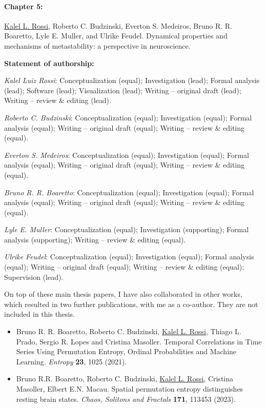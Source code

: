 \paragraph{Chapter 5:}
\underline{Kalel L. Rossi}, Roberto C. Budzinski, Everton S. Medeiros, Bruno R. R. Boaretto, Lyle E. Muller, and Ulrike Feudel. Dynamical properties and mechanisms of metastability: a perspective in neuroscience. 

{\vspace{0.3cm}\footnotesize \textbf{Statement of authorship:} %

\textit{Kalel Luiz Rossi}: Conceptualization (equal); Investigation (lead); Formal analysis (lead); Software (lead); Visualization (lead); Writing – original draft (lead); Writing – review \& editing (lead). 

\textit{Roberto C. Budzinski}: Conceptualization (equal); Investigation (equal); Formal analysis (equal); Writing – original draft (equal); Writing – review \& editing (equal).

\textit{Everton S. Medeiros}: Conceptualization (equal); Investigation (equal); Formal analysis (equal); Writing – original draft (equal); Writing – review \& editing (equal).

\textit{Bruno R. R. Boaretto}: Conceptualization (equal); Investigation (equal); Formal analysis (equal); Writing – original draft (equal); Writing – review \& editing (equal).

\textit{Lyle E. Muller}: Conceptualization (equal); Investigation (supporting); Formal analysis (supporting);  Writing – review \& editing (equal).

\textit{Ulrike Feudel}: Conceptualization (equal); Investigation (equal); Formal analysis (equal); Writing – original draft (equal); Writing – review \& editing (equal); Supervision (lead).
}

\vspace{1cm}


On top of these main thesis papers, I have also collaborated in other works, which resulted in two further publications, with me as a co-author. They are not included in this thesis.
\begin{itemize}
    \item Bruno R. R. Boaretto, Roberto C. Budzinski, \underline{Kalel L. Rossi}, Thiago L. Prado, Sergio R. Lopes and Cristina Masoller. Temporal Correlations in Time Series Using Permutation Entropy, Ordinal Probabilities and Machine Learning. \textit{Entropy} \textbf{23}, 1025 (2021).
    \item Bruno R.R. Boaretto, Roberto C. Budzinski, \underline{Kalel L. Rossi}, Cristina Masoller, Elbert E.N. Macau. Spatial permutation entropy distinguishes resting brain states. \textit{Chaos, Solitons and Fractals} \textbf{171}, 113453 (2023).
\end{itemize}